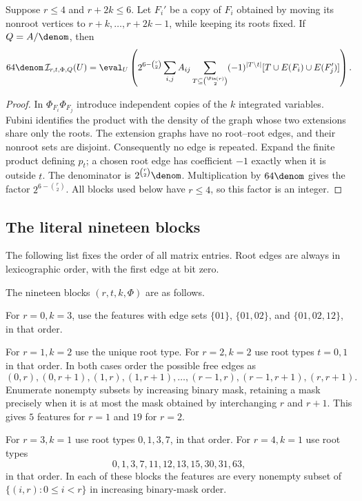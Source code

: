 \begin{lemma}
\label{lem:rooted-expansion}
\proved Suppose $r\le4$ and $r+2k\le6$.  Let $F_i'$ be a copy of $F_i$ obtained by moving its nonroot
vertices to $r+k,\ldots,r+2k-1$, while keeping its roots fixed.  If $Q=A/\denom$, then
\[
 64\denom\,\mathcal I_{r,t,\Phi,Q}(U)
 =\eval_U\left(
 2^{6-\binom r2}\sum_{i,j}A_{ij}
 \sum_{T\subseteq\binom{\Fin(r)}2}
 (-1)^{|T\setminus t|}[T\cup E(F_i)\cup E(F_j')]
 \right).
\]
\end{lemma}
\begin{proof}
In $\Phi_{F_i}\Phi_{F_j}$ introduce independent copies of the $k$ integrated variables.
Fubini identifies the product with the density of the graph whose two extensions share
only the roots.  The extension graphs have no root--root edges, and their nonroot sets are
disjoint.  Consequently no edge is repeated.  Expand the finite product defining $p_t$;
a chosen root edge has coefficient $-1$ exactly when it is outside $t$.  The denominator is
$2^{\binom r2}\denom$.  Multiplication by $64\denom$ gives the factor
$2^{6-\binom r2}$.  All blocks used below have $r\le4$, so this factor is an integer.
\end{proof}

\subsection{The literal nineteen blocks}
The following list fixes the order of all matrix entries.  Root edges are always in
lexicographic order, with the first edge at bit zero.

\begin{definition}
\label{def:feature-schema}
The nineteen blocks $(r,t,k,\Phi)$ are as follows.

For $r=0,k=3$, use the features with edge sets
$\{01\}$, $\{01,02\}$, and $\{01,02,12\}$, in that order.

For $r=1,k=2$ use the unique root type.  For $r=2,k=2$ use root types $t=0,1$ in that
order.  In both cases order the possible free edges as
\[
 (0,r),(0,r+1),(1,r),(1,r+1),\ldots,(r-1,r),(r-1,r+1),(r,r+1).
\]
Enumerate nonempty subsets by increasing binary mask, retaining a mask precisely when it
is at most the mask obtained by interchanging $r$ and $r+1$.  This gives $5$ features for
$r=1$ and $19$ for $r=2$.

For $r=3,k=1$ use root types $0,1,3,7$, in that order.  For $r=4,k=1$ use root types
\[
 0,1,3,7,11,12,13,15,30,31,63,
\]
in that order.  In each of these blocks the features are every nonempty subset of
$\{(i,r):0\le i<r\}$ in increasing binary-mask order.
\end{definition}

